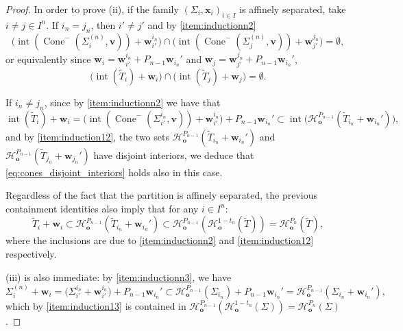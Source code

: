 \documentclass[10pt,a4paper]{amsart}
\newcommand{\ocone}[2]{\operatorname{Cone}^-(#1,#2)}
\begin{document}
\begin{proof}
In order to prove (ii), if the family $(\Sigma_i,\mathbf{x}_i)_{i \in I}$ is affinely separated, take $i\neq j\in I^n$. If $i_n=j_n$, then $i'\neq j'$ and by \ref{item:inductionn2} 
\begin{equation*}
   \Big( \operatorname{int}(\ocone{\Sigma_i^{(n)}}{ \mathbf{v})}+\mathbf{w}_{i'}^{i_n}\Big)\cap \Big( \operatorname{int}(\ocone{\Sigma_j^{(n)}}{ \mathbf{v})}+\mathbf{w}_{j'}^{j_n}\Big)=\emptyset,
\end{equation*}
or equivalently since $\mathbf{w}_i = \mathbf{w}_{i'}^{i_n} + P_{n-1} \mathbf{w}_{i_n}'$ and $\mathbf{w}_j = \mathbf{w}_{j'}^{j_n} + P_{n-1} \mathbf{w}_{i_n}'$,
\begin{equation}\label{eq:cones_disjoint_interiors}
    \Big( \operatorname{int}(\widetilde{T}_i)+\mathbf{w}_{i}\Big)\cap \Big( \operatorname{int}(\widetilde{T}_j)+\mathbf{w}_{j}\Big)=\emptyset .
\end{equation}

If $i_n\neq j_n$, since by \ref{item:inductionn2} we have that
\begin{equation*}
    \operatorname{int}(\widetilde{T}_i)+\mathbf{w}_{i} = \Big( \operatorname{int}(\ocone{\Sigma_{i'}^{i_n}}{ \mathbf{v})}+\mathbf{w}_{i'}^{i_n}\Big)+P_{n-1}\mathbf{w}_{i_n}'
   \subset \operatorname{int}\Big(\mathcal{H}^{P_{n-1}}_\mathbf{o}(\widetilde{T}_{i_n}+\mathbf{w}_{i_n}')\Big),
\end{equation*}
and by \ref{item:induction12}, the two sets $\mathcal{H}^{P_{n-1}}_\mathbf{o}(\widetilde{T}_{i_n}+\mathbf{w}_{i_n}')$ and $\mathcal{H}^{P_{n-1}}_\mathbf{o}(\widetilde{T}_{j_n}+\mathbf{w}_{j_n}')$ have disjoint interiors, we deduce that \eqref{eq:cones_disjoint_interiors} holds also in this case.

Regardless of the fact that the partition is affinely separated, the previous containment identities also imply that for any $i\in I^n$:
\begin{equation*}
   \widetilde{T}_i+\mathbf{w}_{i} \subset \mathcal{H}^{P_{n-1}}_\mathbf{o}(\widetilde{T}_{i_n}+\mathbf{w}_{i_n}')\subset \mathcal{H}^{P_{n-1}}_\mathbf{o}( \mathcal{H}^{1-t_n}_\mathbf{o}(\widetilde T)) =  \mathcal{H}^{P_n}_\mathbf{o}(\widetilde{T}),
\end{equation*}
where the inclusions are due to \ref{item:inductionn2} and \ref{item:induction12} respectively.

(iii) is also immediate: by \ref{item:inductionn3}, we have
\begin{equation*}
    \Sigma_i^{(n)}+\mathbf{w}_i=\big(\Sigma_{i'}^{i_n}+\mathbf{w}_{i'}^{i_n}\big)+P_{n-1}\mathbf{w}_{i_n}'\subset \mathcal{H}^{P_{n-1}}_\mathbf{o}(\Sigma_{i_n})+P_{n-1}\mathbf{w}_{i_n}'=\mathcal{H}^{P_{n-1}}_\mathbf{o}(\Sigma_{i_n} + \mathbf{w}_{i_n}'),
\end{equation*}
which by \ref{item:induction13} is contained in $\mathcal{H}^{P_{n-1}}_\mathbf{o}(\mathcal{H}^{1-t_n}_\mathbf{o}(\Sigma))=\mathcal{H}^{P_n}_\mathbf{o}(\Sigma)$.
\end{proof}
\end{document}
